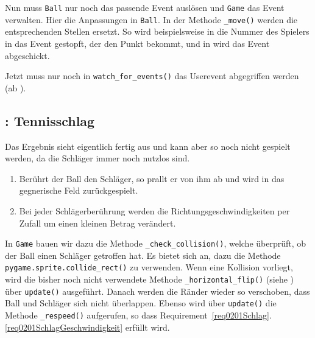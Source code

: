 
Nun muss \texttt{Ball} nur noch das passende Event auslösen und \texttt{Game} das Event verwalten. Hier die Anpassungen in \texttt{Ball}. In der Methode \texttt{\_move()} werden die entsprechenden Stellen ersetzt. So wird beispielsweise in  die Nummer des Spielers in das Event gestopft, der den Punkt bekommt, und in  wird das Event abgeschickt.


Jetzt muss nur noch in \texttt{watch\_for\_events()} das Userevent abgegriffen werden (ab ).




\subsection{: Tennisschlag}

Das Ergebnis sieht eigentlich fertig aus und kann aber so noch nicht gespielt werden, da die Schläger immer noch nutzlos sind.


\begin{enumerate}
	\item Berührt der Ball den Schläger, so prallt er von ihm ab und wird in das gegnerische Feld zurückgespielt.\label{req0201SchlagZurück}
	\item Bei jeder Schlägerberührung werden die Richtungsgeschwindigkeiten per Zufall um einen kleinen Betrag verändert.\label{req0201SchlagGeschwindigkeit}
\end{enumerate}
\er

In \texttt{Game} bauen wir dazu die Methode \texttt{\_check\_collision()}, welche überprüft, ob der Ball einen Schläger getroffen hat. Es bietet sich an, dazu die Methode \texttt{ pygame\-.sprite\-.coll\-ide\_rect()} zu verwenden. Wenn eine Kollision vorliegt, wird die bisher noch nicht verwendete Methode \texttt{\_horizontal\_flip()} (siehe ) über \texttt{update()} ausgeführt. Danach werden die Ränder wieder so verschoben, dass Ball und Schläger sich nicht überlappen. Ebenso wird über \texttt{update()} die Methode \texttt{\_respeed()} aufgerufen, so dass Requirement~\ref{req0201Schlag}.\ref{req0201SchlagGeschwindigkeit} erfüllt wird.

